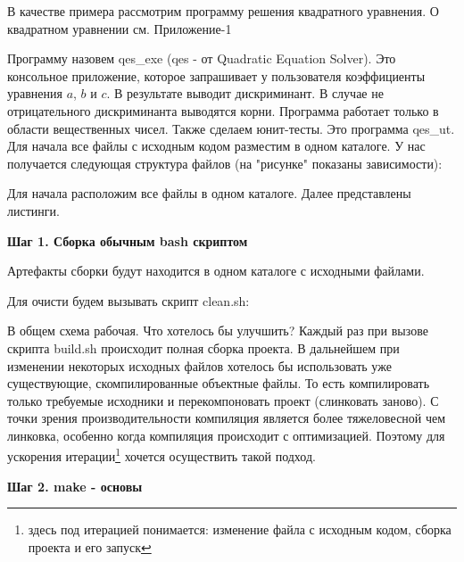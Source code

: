 В качестве примера рассмотрим программу решения квадратного уравнения. О квадратном уравнении см. Приложение-1

Программу назовем qes\_exe (qes - от Quadratic Equation Solver). Это консольное приложение, которое запрашивает у пользователя коэффициенты уравнения $a$, $b$ и $c$. В результате выводит дискриминант. В случае не отрицательного дискриминанта выводятся корни. Программа работает только в области вещественных чисел. Также сделаем юнит-тесты.  Это программа qes\_ut. Для начала все файлы с исходным кодом разместим в одном каталоге. У нас получается следующая структура файлов (на "рисунке" показаны зависимости):

\texttt{}

Для начала расположим все файлы в одном каталоге. Далее представлены листинги.








\textbf{Шаг 1. Сборка обычным bash скриптом}

Артефакты сборки будут находится в одном каталоге с исходными файлами.



Для очисти будем вызывать скрипт clean.sh:



В общем схема рабочая. Что хотелось бы улучшить? Каждый раз при вызове скрипта build.sh происходит полная сборка проекта. В дальнейшем при изменении некоторых исходных файлов хотелось бы использовать уже существующие, скомпилированные объектные файлы. То есть компилировать только требуемые исходники и перекомпоновать проект (слинковать заново). С точки зрения производительности компиляция является более тяжеловесной чем линковка, особенно когда компиляция происходит с оптимизацией. Поэтому для ускорения итерации\footnote{здесь под итерацией понимается: изменение файла с исходным кодом, сборка проекта и его запуск} хочется осуществить такой подход.

\textbf{Шаг 2. make - основы}

\clearpage

